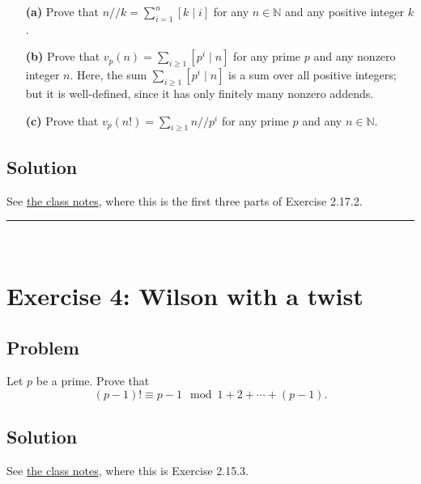 \documentclass[paper=a4, fontsize=12pt]{scrartcl} %
\newcommand{\NN}{\mathbb{N}} %
\newcommand{\tup}[1]{\left( #1 \right)}
\newcommand{\ive}[1]{\left[ #1 \right]}
\newcommand{\horrule}[1]{\rule{\linewidth}{#1}} %
\let\sumnonlimits\sum
\renewcommand{\sum}{\sumnonlimits\limits}
\theoremstyle{plainsl}
\theoremstyle{definition}
\theoremstyle{remark}
\begin{document}
\begin{enumerate}

\item[\textbf{(a)}]
Prove that $n // k = \sum_{i=1}^n \ive{k \mid i}$
for any $n \in \NN$ and any positive integer $k$.

\item[\textbf{(b)}]
Prove that $v_p \tup{n} = \sum_{i \geq 1} \ive{p^i \mid n}$
for any prime $p$ and any nonzero integer $n$.
Here, the sum $\sum_{i \geq 1} \ive{p^i \mid n}$ is
a sum over all positive integers; but it is
well-defined, since it has only finitely many nonzero
addends.

\item[\textbf{(c)}]
Prove that
$v_p \tup{n!} = \sum_{i \geq 1} n // p^i$ for any
prime $p$ and any $n \in \NN$.

\end{enumerate}

\subsection{Solution}

See
\href{http://www-users.math.umn.edu/~dgrinber/19s/notes.pdf}{the class notes},
where this is the first three parts of Exercise 2.17.2.

\horrule{0.3pt} \\[0.4cm]

\section{Exercise 4: Wilson with a twist}

\subsection{Problem}

Let $p$ be a prime.
Prove that
\[
\tup{p-1}! \equiv p-1
\mod 1 + 2 + \cdots + \tup{p-1} .
\]

\subsection{Solution}

See
\href{http://www-users.math.umn.edu/~dgrinber/19s/notes.pdf}{the class notes},
where this is Exercise 2.15.3.
\end{document}
